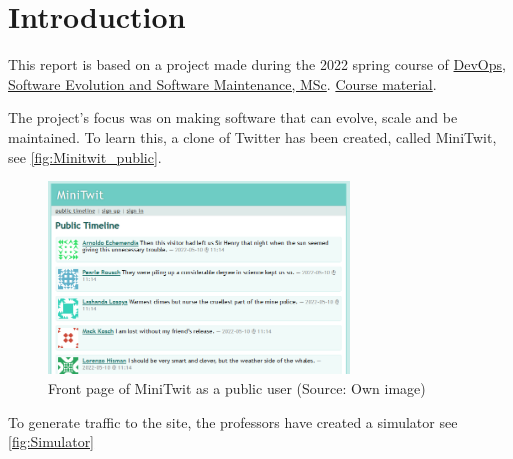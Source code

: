 \section{Introduction}
This report is based on a project made during the 2022 spring course of \href{https://learnit.itu.dk/local/coursebase/view.php?ciid=909}{DevOps, Software Evolution and Software Maintenance, MSc}. \href{https://github.com/itu-devops/lecture_notes/tree/e44664f50c8b0ffb30a77a29e305df3f6750d5d4}{Course material}. 

The project's focus was on making software that can evolve, scale and be maintained. To learn this, a clone of Twitter has been created, called MiniTwit, see \autoref{fig:Minitwit_public}.

\begin{figure}[!ht]
    \centering
    \captionsetup{justification=centering,margin=1cm}
    \includegraphics[width=80mm]{images/introduction/minitwitFrontPage.png}
    \caption{Front page of MiniTwit as a public user (Source: Own image)}
    \label{fig:Minitwit_public}
\end{figure}

To generate traffic to the site, the professors have created a simulator see \autoref{fig:Simulator}

